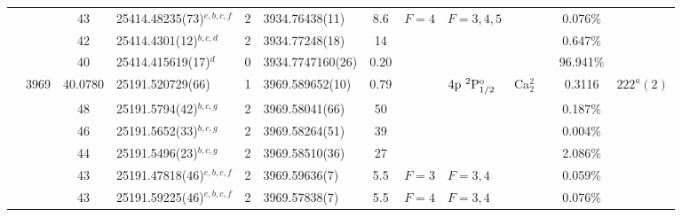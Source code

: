 \begin{table*}
\begin{center}
{\begin{tabular}{:l;l;c;l;c;l;c;l;l;c;c;c;c}
\rowstyle{\itshape}               &        & 43        & 25414.48235(73)$^{e,b,c,f}$      & 2 &    3934.76438(11)  &  8.6 & $F=4                                     $ & $F=3,4,5                                 $ &             &              & 0.076\%   & $     ^{}     $\\
\rowstyle{\itshape}               &        & 42        & 25414.4301(12)$^{b,c,d}$         & 2 &    3934.77248(18)  &   14 & $                                        $ & $                                        $ &             &              & 0.647\%   & $     ^{}     $\\
\rowstyle{\itshape}               &        & 40        & 25414.415619(17)$^{d}$           & 0 &  3934.7747160(26)  & 0.20 & $                                        $ & $                                        $ &             &              & 96.941\%  & $     ^{}     $\\
                                  & 3969   & 40.0780   & 25191.520729(66)$^{}$            & 1 &   3969.589652(10)  & 0.79 & $                                        $ & $4\rm{p}~^2\rm{P}_{1/2}^{\rm o}          $ & Ca$^2_{2}$  &              & 0.3116    & $  222^{a}(2)  $\\
\rowstyle{\itshape}               &        & 48        & 25191.5794(42)$^{b,c,g}$         & 2 &    3969.58041(66)  &   50 & $                                        $ & $                                        $ &             &              & 0.187\%   & $     ^{}     $\\
\rowstyle{\itshape}               &        & 46        & 25191.5652(33)$^{b,c,g}$         & 2 &    3969.58264(51)  &   39 & $                                        $ & $                                        $ &             &              & 0.004\%   & $     ^{}     $\\
\rowstyle{\itshape}               &        & 44        & 25191.5496(23)$^{b,c,g}$         & 2 &    3969.58510(36)  &   27 & $                                        $ & $                                        $ &             &              & 2.086\%   & $     ^{}     $\\
\rowstyle{\itshape}               &        & 43        & 25191.47818(46)$^{e,b,c,f}$      & 2 &    3969.59636(7)   &  5.5 & $F=3                                     $ & $F=3,4                                   $ &             &              & 0.059\%   & $     ^{}     $\\
\rowstyle{\itshape}               &        & 43        & 25191.59225(46)$^{e,b,c,f}$      & 2 &    3969.57838(7)   &  5.5 & $F=4                                     $ & $F=3,4                                   $ &             &              & 0.076\%   & $     ^{}     $\\

\end{tabular}}
\end{center}
\end{table*}
